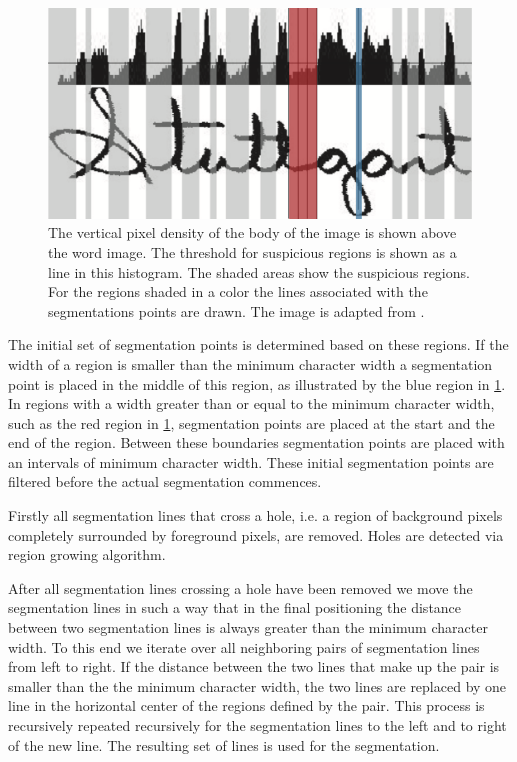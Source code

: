 	\begin{figure}
		\centering
		\includegraphics[width=\columnwidth]{shared/img/method/suspicious_regions.png}
		\caption{The vertical pixel density of the body of the image is shown above the word image. The threshold for suspicious regions is shown as a line in this histogram. The shaded areas show the suspicious regions. For the regions shaded in a color the lines associated with the segmentations points are drawn. The image is adapted from \cite{lee2012binary}.}
		\label{fig:method:segmentation:suspiciousRegions}
	\end{figure}

	The initial set of segmentation points is determined based on these regions. If the width of a region is smaller than the minimum character width a segmentation point is placed in the middle of this region, as illustrated by the blue region in \cref{fig:method:segmentation:suspiciousRegions}. In regions with a width greater than or equal to the minimum character width, such as the red region in \cref{fig:method:segmentation:suspiciousRegions}, segmentation points are placed at the start and the end of the region. Between these boundaries segmentation points are placed with an intervals of minimum character width. These initial segmentation points are filtered before the actual segmentation commences.

	Firstly all segmentation lines that cross a hole, i.e. a region of background pixels completely surrounded by foreground pixels, are removed. Holes are detected via region growing algorithm. 

	After all segmentation lines crossing a hole have been removed we move the segmentation lines in such a way that in the final positioning the distance between two segmentation lines is always greater than the minimum character width. To this end we iterate over all neighboring pairs of segmentation lines from left to right. If the distance between the two lines that make up the pair is smaller than the the minimum character width, the two lines are replaced by one line in the horizontal center of the regions defined by the pair.  This process is recursively repeated recursively for the segmentation lines to the left and to right of the new line. The resulting set of lines is used for the segmentation.

